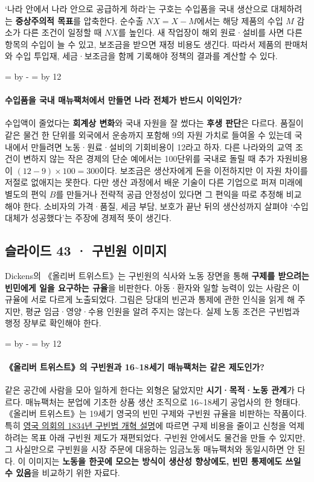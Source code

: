 \documentclass[10pt,a4paper]{article}
\newcommand{\ReserveQuestionSpace}{%
  \par\begingroup
  \dimen0=\pagegoal \advance\dimen0 by -\pagetotal
  \dimen2=\baselineskip \multiply\dimen2 by 12
  \ifdim\dimen0<\dimen2 \newpage\fi
  \endgroup}
\begin{document}
‘나라 안에서 나라 안으로 공급하게 하라’는 구호는 수입품을 국내 생산으로 대체하려는 \textbf{중상주의적 목표}를 압축한다. 순수출 $NX=X-M$에서는 해당 제품의 수입 $M$ 감소가 다른 조건이 일정할 때 $NX$를 높인다. 새 작업장이 해외 원료·설비를 사면 다른 항목의 수입이 늘 수 있고, 보조금을 받으면 재정 비용도 생긴다. 따라서 제품의 판매처와 수입 투입재, 세금·보조금을 함께 기록해야 정책의 결과를 계산할 수 있다.\par

\ReserveQuestionSpace
\paragraph{수입품을 국내 매뉴팩처에서 만들면 나라 전체가 반드시 이익인가?}
수입액이 줄었다는 \textbf{회계상 변화}와 국내 자원을 잘 썼다는 \textbf{후생 판단}은 다르다. 품질이 같은 물건 한 단위를 외국에서 운송까지 포함해 9의 자원 가치로 들여올 수 있는데 국내에서 만들려면 노동·원료·설비의 기회비용이 12라고 하자. 다른 나라와의 교역 조건이 변하지 않는 작은 경제의 단순 예에서는 100단위를 국내로 돌릴 때 추가 자원비용이 $(12-9)\times100=300$이다. 보조금은 생산자에게 돈을 이전하지만 이 자원 차이를 저절로 없애지는 못한다. 다만 생산 과정에서 배운 기술이 다른 기업으로 퍼져 미래에 별도의 편익 $B$를 만들거나 전략적 공급 안정성이 있다면 그 편익을 따로 추정해 비교해야 한다. 소비자의 가격·품질, 세금 부담, 보호가 끝난 뒤의 생산성까지 살펴야 ‘수입 대체가 성공했다’는 주장에 경제적 뜻이 생긴다.\par

\subsection{슬라이드 43 · 구빈원 이미지}
Dickens의 《올리버 트위스트》는 구빈원의 식사와 노동 장면을 통해 \textbf{구제를 받으려는 빈민에게 일을 요구하는 규율}을 비판한다. 아동·환자와 일할 능력이 있는 사람은 이 규율에 서로 다르게 노출되었다. 그림은 당대의 빈곤과 통제에 관한 인식을 읽게 해 주지만, 평균 임금·영양·수용 인원을 알려 주지는 않는다. 실제 노동 조건은 구빈법과 행정 장부로 확인해야 한다.\par

\ReserveQuestionSpace
\paragraph{《올리버 트위스트》의 구빈원과 16\textasciitilde{}18세기 매뉴팩처는 같은 제도인가?}

같은 공간에 사람을 모아 일하게 한다는 외형은 닮았지만 \textbf{시기·목적·노동 관계}가 다르다. 매뉴팩처는 분업에 기초한 상품 생산 조직으로 16\textasciitilde{}18세기 공업사의 한 형태다. 《올리버 트위스트》는 19세기 영국의 빈민 구제와 구빈원 규율을 비판하는 작품이다. 특히 \href{https://www.parliament.uk/about/living-heritage/transformingsociety/livinglearning/19thcentury/overview/poorlaw/}{영국 의회의 1834년 구빈법 개혁 설명}에 따르면 구제 비용을 줄이고 신청을 억제하려는 목표 아래 구빈원 제도가 재편되었다. 구빈원 안에서도 물건을 만들 수 있지만, 그 사실만으로 구빈원을 시장 주문에 대응하는 임금노동 매뉴팩처와 동일시하면 안 된다. 이 이미지는 \textbf{노동을 한곳에 모으는 방식이 생산성 향상에도, 빈민 통제에도 쓰일 수 있음}을 비교하기 위한 자료다.\par
\end{document}

